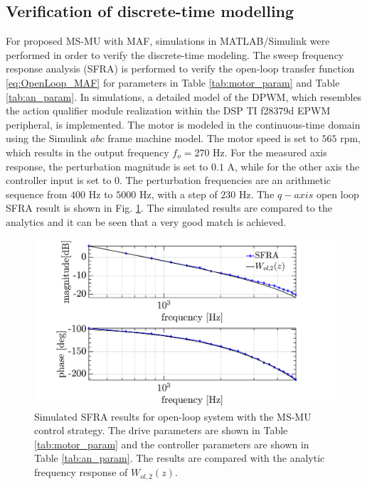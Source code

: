 \documentclass[conference]{IEEEtran}
\begin{document}
\subsection{Verification of discrete-time modelling}
For proposed MS-MU with MAF, simulations in MATLAB/Simulink were performed in order to verify the discrete-time modeling. 
The sweep frequency response analysis (SFRA) is performed to verify the open-loop transfer function \eqref{eq:OpenLoop_MAF} for parameters in Table \ref{tab:motor_param} and Table \ref{tab:an_param}. In simulations, a detailed model of the DPWM, which resembles the action qualifier module realization within the DSP TI f28379d EPWM peripheral, is implemented. The motor is modeled in the continuous-time domain using the Simulink $abc$ frame machine model. The motor speed is set to $565$ rpm, which results in the output frequency $f_o = 270$ Hz.
For the measured axis response, the perturbation magnitude is set to $0.1$ A, while for the other axis the controller input is set to $0$. The perturbation frequencies are an arithmetic sequence from $400$ Hz to $5000$ Hz, with a step of $230$ Hz. The $q-axis$ open loop SFRA result is shown in Fig. \ref{fig:MSMUmaf_olfra}. The simulated results are compared to the analytics and it can be seen that a very good match is achieved.

\begin{figure}[t!]
    \centerline{\includegraphics[width=1\linewidth]{figures/ivan figs/MSMU_OL_SFRA.png}}
    \caption{Simulated SFRA results for open-loop system with the MS-MU control strategy. The drive parameters are shown in Table \ref{tab:motor_param} and the controller parameters are shown in Table \ref{tab:an_param}. The results are compared with the analytic frequency response of $W_{ol,2}(z)$. }
    \label{fig:MSMUmaf_olfra} 
\end{figure}
\end{document}
